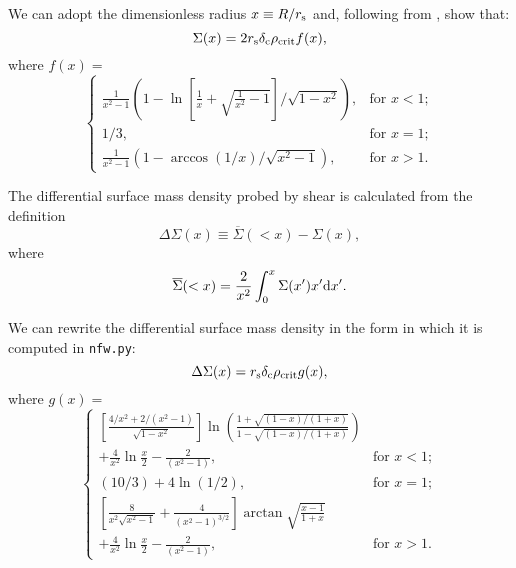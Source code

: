 \documentclass[twocolumn]{aastex6}
\newcommand{\code}{\lstinline[style=codeintext]}
\begin{document}
We can adopt the dimensionless radius $x \equiv R/r_{\rm s}$ and, following from \citet{Wright00}, show that:
\begin{equation}\label{sigma}
\Sigma(x) = 2 r_{\rm s} \delta_{\rm c} \rho_{\rm crit} f(x),
\end{equation}
where $f(x) = $
\begin{equation}
    \begin{cases}
        \frac{1}{x^2 - 1} \left( 1 - \ln{ \left[ \frac{1}{x} + \sqrt{ \frac{1}{x^2} - 1} \right]} / \sqrt{1 - x^2} \right), & \text{for } x < 1; \\
        1/3, & \text{for } x = 1; \\
        \frac{1}{x^2 - 1} \left( 1 - \arccos{(1/x)} / \sqrt{x^2 - 1} \right), & \text{for } x > 1.
    \end{cases}
\end{equation}

The differential surface mass density probed by shear is calculated from the definition
\begin{equation}\label{dsigma}
\Delta\Sigma(x) \equiv  \overline{\Sigma}(<x) - \Sigma(x),
\end{equation}
where
\begin{equation}\label{sigbar}
\overline{\Sigma}(<x) = \frac{2}{x^2} \int_0^{x} \Sigma(x') x' {\rm d}x'.
\end{equation}

We can rewrite the differential surface mass density in the form in which it is computed in \code{nfw.py}:
\begin{equation}
     \Delta\Sigma(x) = r_{\rm s} \delta_{\rm c} \rho_{\rm crit} g(x),
\end{equation}
where  $g(x) = $
\begin{equation}
    \begin{cases}

    \left[ \frac{4 / x^2 + 2/ (x^2 - 1)}{\sqrt{1 - x^2}} \right] \ln \left( \frac{1 + \sqrt{(1-x) / (1+x)} }{1 - \sqrt{(1-x) / (1+x)} } \right) \\ + \frac{4}{x^2} \ln \frac{x}{2} - \frac{2}{(x^2 - 1)}, & \text{for } x < 1; \\
    
    (10/3) + 4 \ln(1/2), & \text{for } x = 1; \\
    
    \left[ \frac{8}{x^2 \sqrt{x^2 - 1}} + \frac{4}{(x^2 - 1)^{3/2}} \right] \arctan\sqrt{\frac{x-1}{1+x}} \\ + \frac{4}{x^2} \ln \frac{x}{2} - \frac{2}{(x^2 - 1)}, & \text{for } x > 1.

    \end{cases}
\end{equation}
\end{document}
